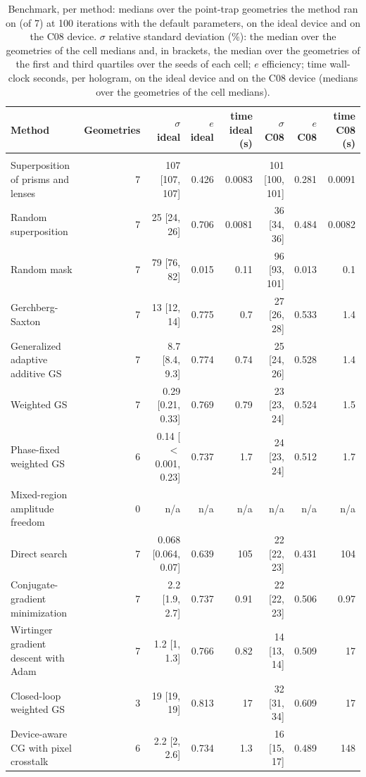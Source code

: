 \begin{table}[t]\centering\footnotesize
\caption{Benchmark, per method: medians over the point-trap geometries the method ran on (of 7) at 100 iterations with the default parameters, on the ideal device and on the C08 device. $\sigma$ relative standard deviation (\%): the median over the geometries of the cell medians and, in brackets, the median over the geometries of the first and third quartiles over the seeds of each cell; $e$ efficiency; time wall-clock seconds, per hologram, on the ideal device and on the C08 device (medians over the geometries of the cell medians).}\label{tab:benchmethods}
\begin{tabular}{@{}>{\raggedright\arraybackslash}p{} r r r r r r r@{}}\toprule Method & Geometries & $\sigma$ ideal & $e$ ideal & time ideal (s) & $\sigma$ C08 & $e$ C08 & time C08 (s)\\\midrule
\multicolumn{8}{@{}l}{\textit{Published methods}}\\
Superposition of prisms and lenses & 7 & 107 [107, 107] & 0.426 & 0.0083 & 101 [100, 101] & 0.281 & 0.0091\\
Random superposition & 7 & 25 [24, 26] & 0.706 & 0.0081 & 36 [34, 36] & 0.484 & 0.0082\\
Random mask & 7 & 79 [76, 82] & 0.015 & 0.11 & 96 [93, 101] & 0.013 & 0.1\\
Gerchberg-Saxton & 7 & 13 [12, 14] & 0.775 & 0.7 & 27 [26, 28] & 0.533 & 1.4\\
Generalized adaptive additive GS & 7 & 8.7 [8.4, 9.3] & 0.774 & 0.74 & 25 [24, 26] & 0.528 & 1.4\\
Weighted GS & 7 & 0.29 [0.21, 0.33] & 0.769 & 0.79 & 23 [23, 24] & 0.524 & 1.5\\
Phase-fixed weighted GS & 6 & 0.14 [$<$0.001, 0.23] & 0.737 & 1.7 & 24 [23, 24] & 0.512 & 1.7\\
Mixed-region amplitude freedom & 0 & n/a & n/a & n/a & n/a & n/a & n/a\\
Direct search & 7 & 0.068 [0.064, 0.07] & 0.639 & 105 & 22 [22, 23] & 0.431 & 104\\
Conjugate-gradient minimization & 7 & 2.2 [1.9, 2.7] & 0.737 & 0.91 & 22 [22, 23] & 0.506 & 0.97\\
Wirtinger gradient descent with Adam & 7 & 1.2 [1, 1.3] & 0.766 & 0.82 & 14 [13, 14] & 0.509 & 17\\
Closed-loop weighted GS & 3 & 19 [19, 19] & 0.813 & 17 & 32 [31, 34] & 0.609 & 17\\
Device-aware CG with pixel crosstalk & 6 & 2.2 [2, 2.6] & 0.734 & 1.3 & 16 [15, 17] & 0.489 & 148\\

\end{tabular}
\end{table}
